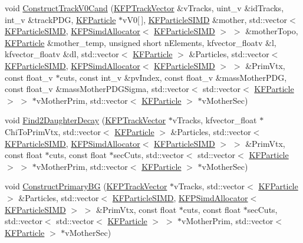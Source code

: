 \begin{DoxyCompactItemize}
\item 
void \hyperlink{classKFParticleFinder_a9d0040c76e7e04dc0abdafb82612d791}{Construct\+Track\+V0\+Cand} (\hyperlink{classKFPTrackVector}{K\+F\+P\+Track\+Vector} \&v\+Tracks, uint\+\_\+v \&id\+Tracks, int\+\_\+v \&track\+P\+DG, \hyperlink{classKFParticle}{K\+F\+Particle} $\ast$v\+V0\mbox{[}$\,$\mbox{]}, \hyperlink{classKFParticleSIMD}{K\+F\+Particle\+S\+I\+MD} \&mother, std\+::vector$<$ \hyperlink{classKFParticleSIMD}{K\+F\+Particle\+S\+I\+MD}, \hyperlink{classKFPSimdAllocator}{K\+F\+P\+Simd\+Allocator}$<$ \hyperlink{classKFParticleSIMD}{K\+F\+Particle\+S\+I\+MD} $>$ $>$ \&mother\+Topo, \hyperlink{classKFParticle}{K\+F\+Particle} \&mother\+\_\+temp, unsigned short n\+Elements, kfvector\+\_\+floatv \&l, kfvector\+\_\+floatv \&dl, std\+::vector$<$ \hyperlink{classKFParticle}{K\+F\+Particle} $>$ \&Particles, std\+::vector$<$ \hyperlink{classKFParticleSIMD}{K\+F\+Particle\+S\+I\+MD}, \hyperlink{classKFPSimdAllocator}{K\+F\+P\+Simd\+Allocator}$<$ \hyperlink{classKFParticleSIMD}{K\+F\+Particle\+S\+I\+MD} $>$ $>$ \&Prim\+Vtx, const float\+\_\+v $\ast$cuts, const int\+\_\+v \&pv\+Index, const float\+\_\+v \&mass\+Mother\+P\+DG, const float\+\_\+v \&mass\+Mother\+P\+D\+G\+Sigma, std\+::vector$<$ std\+::vector$<$ \hyperlink{classKFParticle}{K\+F\+Particle} $>$ $>$ $\ast$v\+Mother\+Prim, std\+::vector$<$ \hyperlink{classKFParticle}{K\+F\+Particle} $>$ $\ast$v\+Mother\+Sec)
\item 
void \hyperlink{classKFParticleFinder_a3f6967ae8b6839bc7de48991eaa812ef}{Find2\+Daughter\+Decay} (\hyperlink{classKFPTrackVector}{K\+F\+P\+Track\+Vector} $\ast$v\+Tracks, kfvector\+\_\+float $\ast$Chi\+To\+Prim\+Vtx, std\+::vector$<$ \hyperlink{classKFParticle}{K\+F\+Particle} $>$ \&Particles, std\+::vector$<$ \hyperlink{classKFParticleSIMD}{K\+F\+Particle\+S\+I\+MD}, \hyperlink{classKFPSimdAllocator}{K\+F\+P\+Simd\+Allocator}$<$ \hyperlink{classKFParticleSIMD}{K\+F\+Particle\+S\+I\+MD} $>$ $>$ \&Prim\+Vtx, const float $\ast$cuts, const float $\ast$sec\+Cuts, std\+::vector$<$ std\+::vector$<$ \hyperlink{classKFParticle}{K\+F\+Particle} $>$ $>$ $\ast$v\+Mother\+Prim, std\+::vector$<$ \hyperlink{classKFParticle}{K\+F\+Particle} $>$ $\ast$v\+Mother\+Sec)
\item 
void \hyperlink{classKFParticleFinder_ae68561ffcd9f3bf3e8230604678105c5}{Construct\+Primary\+BG} (\hyperlink{classKFPTrackVector}{K\+F\+P\+Track\+Vector} $\ast$v\+Tracks, std\+::vector$<$ \hyperlink{classKFParticle}{K\+F\+Particle} $>$ \&Particles, std\+::vector$<$ \hyperlink{classKFParticleSIMD}{K\+F\+Particle\+S\+I\+MD}, \hyperlink{classKFPSimdAllocator}{K\+F\+P\+Simd\+Allocator}$<$ \hyperlink{classKFParticleSIMD}{K\+F\+Particle\+S\+I\+MD} $>$ $>$ \&Prim\+Vtx, const float $\ast$cuts, const float $\ast$sec\+Cuts, std\+::vector$<$ std\+::vector$<$ \hyperlink{classKFParticle}{K\+F\+Particle} $>$ $>$ $\ast$v\+Mother\+Prim, std\+::vector$<$ \hyperlink{classKFParticle}{K\+F\+Particle} $>$ $\ast$v\+Mother\+Sec)

\end{DoxyCompactItemize}

